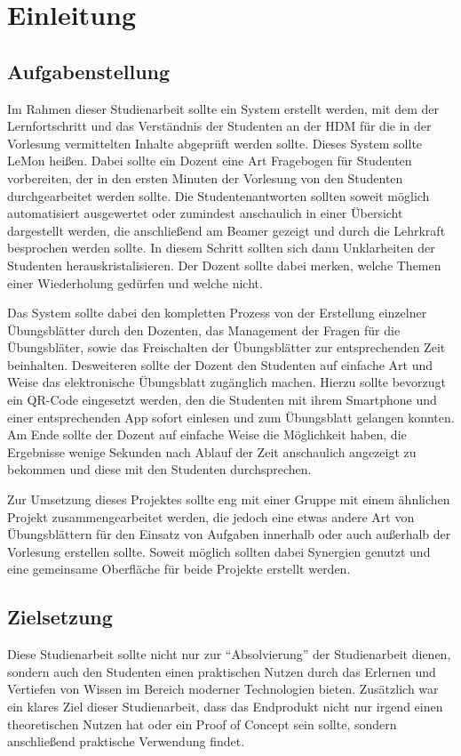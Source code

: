\chapter{Einleitung}

\section{Aufgabenstellung}
Im Rahmen dieser Studienarbeit sollte ein System erstellt werden, mit dem der Lernfortschritt und
das Verständnis  der Studenten an der \gls{HDM} für die in der Vorlesung vermittelten Inhalte
abgeprüft werden sollte. Dieses System sollte \gls{LeMon} heißen. Dabei sollte ein Dozent eine Art
Fragebogen für Studenten vorbereiten, der in den ersten Minuten der Vorlesung von den Studenten
durchgearbeitet werden sollte. Die Studentenantworten sollten soweit möglich automatisiert
ausgewertet oder zumindest anschaulich in einer Übersicht dargestellt werden, die anschließend am
Beamer gezeigt und durch die Lehrkraft besprochen werden sollte. In diesem Schritt sollten sich dann
Unklarheiten der Studenten herauskristalisieren. Der Dozent sollte dabei merken, welche Themen einer
Wiederholung gedürfen und welche nicht.

Das System sollte dabei den kompletten Prozess von der Erstellung einzelner Übungsblätter durch den
Dozenten, das Management der Fragen für die Übungsbläter, sowie das Freischalten der Übungsblätter
zur entsprechenden Zeit beinhalten.
Desweiteren sollte der Dozent den Studenten auf einfache Art und Weise das elektronische Übungsblatt
zugänglich machen. Hierzu sollte bevorzugt ein QR-Code eingesetzt werden, den die Studenten mit
ihrem Smartphone und einer entsprechenden App sofort einlesen und zum Übungsblatt gelangen konnten.
\newline Am Ende sollte der Dozent auf einfache Weise die Möglichkeit haben, die Ergebnisse wenige
Sekunden nach Ablauf der Zeit anschaulich angezeigt zu bekommen und diese mit den Studenten
durchsprechen.

Zur Umsetzung dieses Projektes sollte eng mit einer Gruppe mit einem ähnlichen Projekt
zusammengearbeitet werden, die jedoch eine etwas andere Art von Übungsblättern für den Einsatz von
Aufgaben innerhalb oder auch außerhalb der Vorlesung erstellen sollte. Soweit möglich sollten dabei
Synergien genutzt und eine gemeinsame Oberfläche für beide Projekte erstellt werden.


\section{Zielsetzung}
Diese Studienarbeit sollte nicht nur zur "`Absolvierung"' der Studienarbeit dienen, sondern auch den
Studenten einen praktischen Nutzen durch das Erlernen und Vertiefen von Wissen im Bereich moderner
Technologien bieten. Zusätzlich war ein klares Ziel dieser Studienarbeit, dass das Endprodukt nicht
nur irgend einen theoretischen Nutzen hat oder ein Proof of Concept sein sollte, sondern
anschließend praktische Verwendung findet.
 

